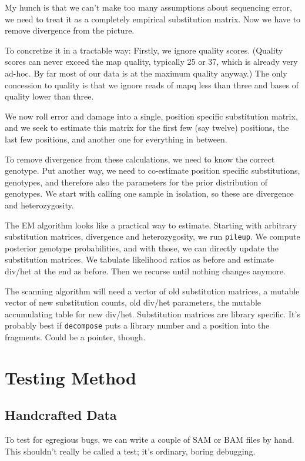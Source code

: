 \documentclass{article}
\begin{document}
My hunch is that we can't make too many assumptions about sequencing
error, we need to treat it as a completely empirical substitution
matrix.  Now we have to remove divergence from the picture.

To concretize it in a tractable way:  Firstly, we ignore quality scores.
(Quality scores can never exceed the map quality, typically 25 or 37,
which is already very ad-hoc.  By far most of our data is at the maximum
quality anyway.)  The only concession to quality is that we ignore reads
of mapq less than three and bases of quality lower than three.

We now roll error and damage into a single, position specific
substitution matrix, and we seek to estimate this matrix for the first
few (say twelve) positions, the last few positions, and another one for
everything in between.

To remove divergence from these calculations, we need to know the
correct genotype.  Put another way, we need to co-estimate position
specific substitutions, genotypes, and therefore also the parameters for
the prior distribution of genotypes.  We start with calling one sample
in isolation, so these are divergence and heterozygosity.

The EM algorithm looks like a practical way to estimate.  Starting with
arbitrary substitution matrices, divergence and heterozygosity, we run
\texttt{pileup}.  We compute posterior genotype probabilities, and with
those, we can directly update the substitution matrices.  We tabulate
likelihood ratios as before and estimate div/het at the end as before.
Then we recurse until nothing changes anymore.

The scanning algorithm will need a vector of old substitution matrices,
a mutable vector of new substitution counts, old div/het parameters, the
mutable accumulating table for new div/het.  Substitution matrices are
library specific.  It's probably best if \texttt{decompose} puts a
library number and a position into the fragments.  Could be a pointer,
though.

\section{Testing Method}

\subsection{Handcrafted Data}

To test for egregious bugs, we can write a couple of SAM or BAM files by
hand.  This shouldn't really be called a test; it's ordinary, boring
debugging.
\end{document}
